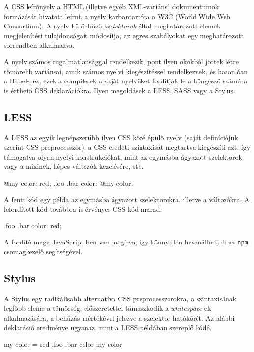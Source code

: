 A CSS leírónyelv a HTML (illetve egyéb XML-variáns) dokumentumok formázását
hivatott leírni, a nyelv karbantartója a W3C (World Wide Web Consortium). A
nyelv különböző \emph{szelektorok} által meghatározott elemek megjelenítési
tulajdonságait módosítja, az egyes szabályokat egy meghatározott sorrendben
alkalmazva.

A nyelv számos rugalmatlansággal rendelkezik, pont ilyen okokból jöttek létre
tömörebb variánsai, amik számos nyelvi kiegészítéssel rendelkeznek, és
hasonlóan a Babel-hez, ezek a compilerek a saját nyelvüket fordítják le a
böngésző számára is érthető CSS deklarációkra.  Ilyen megoldások a LESS, SASS
vagy a Stylus.

\subsection{LESS}

A LESS az egyik legnépszerűbb ilyen CSS köré épülő nyelv (saját definíciójuk
szerint CSS preprocesszor), a CSS eredeti szintaxisát megtartva kiegészíti azt,
így támogatva olyan nyelvi konstrukciókat, mint az egymásba ágyazott
szelektorok vagy a mixinek, képes változók kezelésére, stb.

\begin{css}
@my-color: red;
.foo {
  .bar {
    color: @my-color;
  }
}
\end{css}

A fenti kód egy példa az egymásba ágyazott szelektorokra, illetve a változókra.
A lefordított kód továbbra is érvényes CSS kód marad:

\begin{css}
.foo .bar {
  color: red;
}
\end{css}

A fordító maga JavaScript-ben van megírva, így könnyedén használhatjuk az
\texttt{npm} csomagkezelő segítségével.

\subsection{Stylus}

A Stylus egy radikálisabb alternatíva CSS preprocesszorokra, a szintaxisának
legfőbb eleme a tömörség, előszeretettel támaszkodik a \emph{whitespace}-ek
alkalmazására, a behúzás mértékével jelezve a szelektor hatókörét.  Az alábbi
deklaráció eredménye ugyanaz, mint a LESS példában szereplő kódé.

\begin{css}
my-color = red
.foo
  .bar
    color my-color
\end{css}

